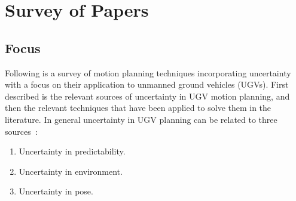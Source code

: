 \chapter{Survey of Papers}
\label{chp:survey-of-papers}

\section{Focus}
Following is a survey of motion planning techniques incorporating uncertainty
with a focus on their application to unmanned ground vehicles (UGVs). First
described is the relevant sources of uncertainty in UGV motion planning, and
then the relevant techniques that have been applied to solve them in the
literature. In general uncertainty in UGV planning can be related to three
sources~\cite{lavalleFrameworkMotionPlanning1995}:
\begin{enumerate}
\item Uncertainty in predictability.
\item Uncertainty in environment.
\item Uncertainty in pose.
\end{enumerate}

